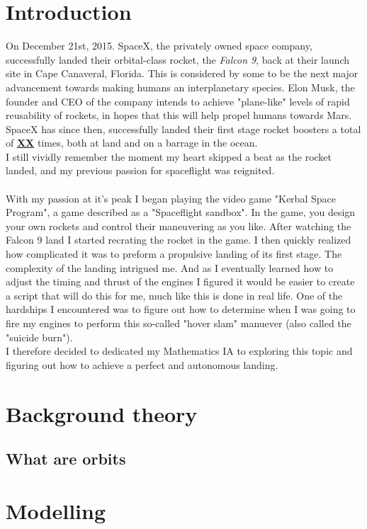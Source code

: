 \documentclass[12pt]{article}
\begin{document}
    \tableofcontents
    \thispagestyle{empty}
    \addtocounter{page}{-1}
    
    
    \newpage
    \section{Introduction} %
        On December 21st, 2015. SpaceX, the privately owned space company, successfully landed their orbital-class rocket, the \textit{Falcon 9}, back at their launch site in Cape Canaveral, Florida. 
        This is considered by some to be the next major advancement towards making humans an interplanetary species. Elon Musk, the founder and CEO of the company 
        intends to achieve "plane-like" levels of rapid reusability of rockets, in hopes that this will help propel humans towards Mars. 
    \\
        SpaceX has since then, successfully landed their first stage rocket boosters a total of \textbf{\underline{XX}} times, both at land and on a barrage in the ocean. 
    \\ 
        I still vividly remember the moment my heart skipped a beat as the rocket landed, and my previous passion for spaceflight was reignited.
    \paragraph{}
        With my passion at it's peak I began playing the video game "Kerbal Space Program", a game described as a "Spaceflight sandbox". In the game, you design your own rockets and 
        control their maneuvering as you like. After watching the Falcon 9 land I started recrating the rocket in the game. 
        I then quickly realized how complicated it was to preform a propulsive landing of its first stage. The complexity of the landing intrigued me. 
        And as I eventually learned how to adjust the timing and thrust of the engines I figured it would be easier to create a script that will do this for me, much like this is done in real life.
    \break
        One of the hardships I encountered was to figure out how to determine when I was going to fire my engines to perform this so-called "hover slam" manuever 
        (also called the "suicide burn"). \\
        I therefore decided to dedicated my Mathematics IA to exploring this topic and figuring out how to achieve a perfect and autonomous landing.

    

    \section{Background theory}
        \subsection{What are orbits}
    \section{Modelling} 

    
\end{document}
